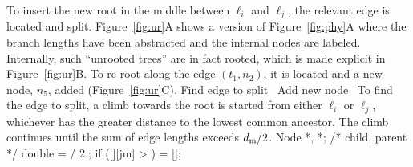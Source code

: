 \nwendcode{}\nwdocspar
To insert the new root in the middle between $\ell_i$ and $\ell_j$,
the relevant edge is located and split. Figure~\ref{fig:ur}A shows a
version of Figure~\ref{fig:phy}A where the branch lengths have been
abstracted and the internal nodes are labeled. Internally, such
``unrooted trees'' are in fact rooted, which is made explicit in
Figure~\ref{fig:ur}B. To re-root along the edge $(t_1,n_2)$, it is
located and a new node, $n_5$, added (Figure~\ref{fig:ur}C).
\nwenddocs{}\endmoddef\nwstartdeflinemarkup{}\nwenddeflinemarkup
\LA{}Find edge to split~{\nwtagstyle{}}\RA{}
\LA{}Add new node~{\nwtagstyle{}}\RA{}
\nwendcode{}\nwdocspar
To find the edge to split, a climb towards the root is started from
either $\ell_i$ or $\ell_j$, whichever has the greater distance to the
lowest common ancestor. The climb continues until the sum of edge
lengths exceeds $d_{\rm m} / 2$.
\nwenddocs{}\endmoddef\nwstartdeflinemarkup{}\nwenddeflinemarkup
Node *, *;  /* child, parent */
double  =  / 2.;
if ([][jm] > )
   = [];
